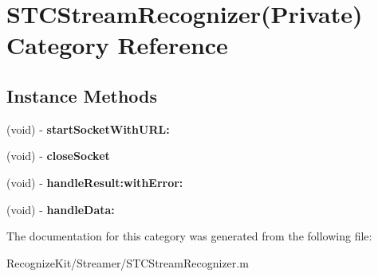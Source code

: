 \hypertarget{category_s_t_c_stream_recognizer_07_private_08}{}\section{S\+T\+C\+Stream\+Recognizer(Private) Category Reference}
\label{category_s_t_c_stream_recognizer_07_private_08}
\subsection*{Instance Methods}
\begin{DoxyCompactItemize}
\item 
\hypertarget{category_s_t_c_stream_recognizer_07_private_08_a8516c67419de476f0b190c57fb044ab8}{}\label{category_s_t_c_stream_recognizer_07_private_08_a8516c67419de476f0b190c57fb044ab8} 
(void) -\/ {\bfseries start\+Socket\+With\+U\+R\+L\+:}
\item 
\hypertarget{category_s_t_c_stream_recognizer_07_private_08_aa820c52a23a72198182c0baff4d5c7af}{}\label{category_s_t_c_stream_recognizer_07_private_08_aa820c52a23a72198182c0baff4d5c7af} 
(void) -\/ {\bfseries close\+Socket}
\item 
\hypertarget{category_s_t_c_stream_recognizer_07_private_08_ab967733984812585451fb1fa1a6b9396}{}\label{category_s_t_c_stream_recognizer_07_private_08_ab967733984812585451fb1fa1a6b9396} 
(void) -\/ {\bfseries handle\+Result\+:with\+Error\+:}
\item 
\hypertarget{category_s_t_c_stream_recognizer_07_private_08_a77b60c18b4d1e6f73a830420d7a37813}{}\label{category_s_t_c_stream_recognizer_07_private_08_a77b60c18b4d1e6f73a830420d7a37813} 
(void) -\/ {\bfseries handle\+Data\+:}
\end{DoxyCompactItemize}


The documentation for this category was generated from the following file\+:\begin{DoxyCompactItemize}
\item 
Recognize\+Kit/\+Streamer/S\+T\+C\+Stream\+Recognizer.\+m\end{DoxyCompactItemize}
